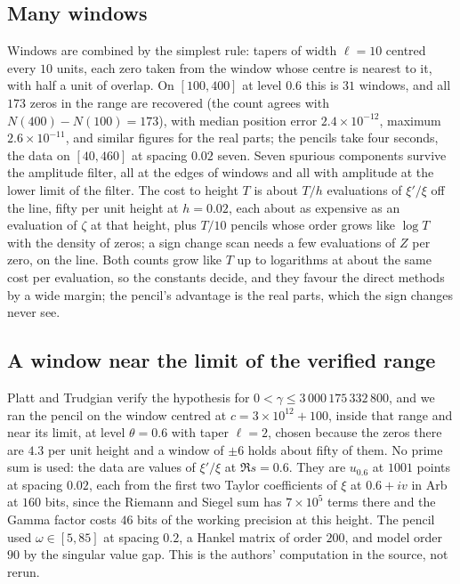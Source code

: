 \subsection{Many windows}

Windows are combined by the simplest rule: tapers of width $\ell=10$ centred every $10$ units, each zero taken from the window whose centre is nearest to it, with half a unit of overlap. On $[100,400]$ at level $0.6$ this is $31$ windows, and all $173$ zeros in the range are recovered (the count agrees with $N(400)-N(100)=173$), with median position error $2.4\times10^{-12}$, maximum $2.6\times10^{-11}$, and similar figures for the real parts; the pencils take four seconds, the data on $[40,460]$ at spacing $0.02$ seven. Seven spurious components survive the amplitude filter, all at the edges of windows and all with amplitude at the lower limit of the filter. The cost to height $T$ is about $T/h$ evaluations of $\xi'/\xi$ off the line, fifty per unit height at $h=0.02$, each about as expensive as an evaluation of $\zeta$ at that height, plus $T/10$ pencils whose order grows like $\log T$ with the density of zeros; a sign change scan needs a few evaluations of $Z$ per zero, on the line. Both counts grow like $T$ up to logarithms at about the same cost per evaluation, so the constants decide, and they favour the direct methods by a wide margin; the pencil's advantage is the real parts, which the sign changes never see.

\subsection{A window near the limit of the verified range}\label{es:sec:above}

Platt and Trudgian \cite{PT21} verify the hypothesis for $0<\gamma\le3\,000\,175\,332\,800$, and we ran the pencil on the window centred at $c=3\times10^{12}+100$, inside that range and near its limit, at level $\theta=0.6$ with taper $\ell=2$, chosen because the zeros there are $4.3$ per unit height and a window of $\pm6$ holds about fifty of them. No prime sum is used: the data are values of $\xi'/\xi$ at $\Re s=0.6$. They are $u_{0.6}$ at $1001$ points at spacing $0.02$, each from the first two Taylor coefficients of $\xi$ at $0.6+iv$ in Arb at $160$ bits, since the Riemann and Siegel sum has $7\times10^5$ terms there and the Gamma factor costs $46$ bits of the working precision at this height. The pencil used $\omega\in[5,85]$ at spacing $0.2$, a Hankel matrix of order $200$, and model order $90$ by the singular value gap. This is the authors' computation in the source, not rerun.

